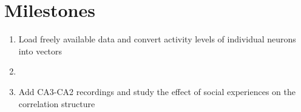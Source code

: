 \documentclass{article}
\begin{document}
\section{Milestones}
\begin{enumerate}
    \item Load freely available data and convert activity levels of individual neurons into vectors
    \item 
    \item Add CA3-CA2 recordings and study the effect of social experiences on the correlation structure
\end{enumerate}


\end{document}

